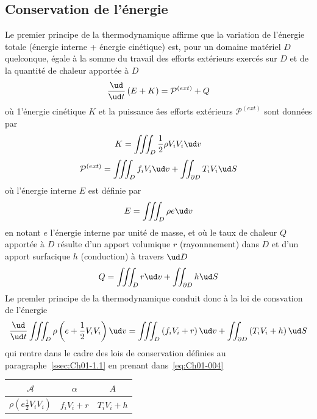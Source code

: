 \subsection{Conservation de l'énergie} \label{ssec:Ch01-3.1}
Le premier principe de la thermodynamique affirme que la variation de l'énergie totale (énergie interne + énergie cinétique) est, pour un domaine matériel $D$ quelconque, égale à la somme du travail des efforts extérieurs exercés sur $D$ et de la quantité de chaleur apportée à $D$
\begin{equation}
    \frac{\ud}{\ud t} \left( E + K \right) = \mathcal{P}^{(ext)} + Q
    \label{eq:Ch01-040}
\end{equation}
où 1'énergie cinétique $K$ et la puissance âes efforts extérieurs $\mathcal{P}^{(ext)}$ sont données par
\begin{equation}
    K = \iiint_{D} \frac{1}{2} \rho V_i V_i \ud v
    \label{eq:Ch01-041}
\end{equation}
\begin{equation}
    \mathcal{P}^{(ext)} = \iiint_{D} f_i V_i \ud v + \iint_{\partial D} T_i V_i \ud S
    \label{eq:Ch01-042}
\end{equation}
où l'énergie interne $E$ est définie par
\begin{equation}
    E = \iiint_{D} \rho e \ud v
    \label{eq:Ch01-043}
\end{equation}
en notant $e$ l'énergie interne par unité de masse, et où le taux de chaleur $Q$ apportée à $D$ résulte d'un apport volumique $r$ (rayonnnement) dans $D$ et d'un apport surfacique $h$ (conduction) à travers $\ud D$
\begin{equation}
    Q = \iiint_{D} r \ud v + \iint_{\partial D} h \ud S
    \label{eq:Ch01-044}
\end{equation}
Le premler principe de la thermodynamique conduit donc à la loi de consvation de l'énergie
\begin{equation}
    \frac{\ud}{\ud t} \iiint_D \rho \left( e + \frac{1}{2} V_i V_i \right) \ud v = \iiint_D \left( f_i V_i + r \right) \ud v + \iint_{\partial D} \left( T_i V_i + h \right) \ud S
    \label{eq:Ch01-045}
\end{equation}
qui rentre dans le cadre des lois de conservation définies au paragraphe~\ref{ssec:Ch01-1.1} en prenant
dans~\eqref{eq:Ch01-004}
\begin{table}
    \centering
    \begin{tabular}[]{c|c|c}
        $\mathcal{A}$ & $\alpha$ & $A$ \\ \hline
        $\rho \left( e \frac{1}{2} V_i V_i \right)$ & $f_i V_i + r$ & $T_i V_i + h$
    \end{tabular}
\end{table}

